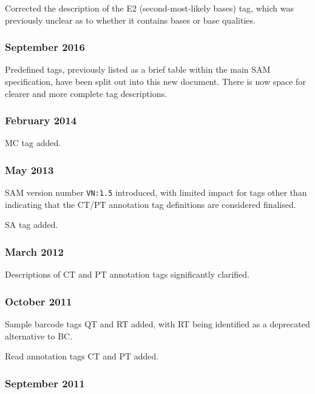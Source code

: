 \documentclass[10pt]{article}
\begin{document}
\begin{appendices}
Corrected the description of the E2 (second-most-likely bases) tag, which was previously unclear as to whether it contains bases or base qualities.

\subsubsection*{September 2016}

Predefined tags, previously listed as a brief table within the main SAM specification, have been split out into this new document.
There is now space for clearer and more complete tag descriptions.

\subsubsection*{February 2014}

MC tag added.

\subsubsection*{May 2013}

SAM version number {\tt VN:1.5} introduced, with limited impact for tags other than indicating that the CT/PT annotation tag definitions are considered finalised.

\gap
SA tag added.

\subsubsection*{March 2012}

Descriptions of CT and PT annotation tags significantly clarified.

\subsubsection*{October 2011}

Sample barcode tags QT and RT added, with RT being identified as a deprecated alternative to BC.

Read annotation tags CT and PT added.

\subsubsection*{September 2011}


\end{appendices}
\end{document}
